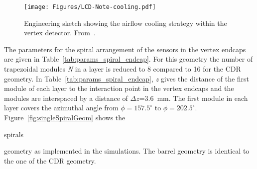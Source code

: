 
\begin{figure}[H]
  \centering
  \texttt{[image: Figures/LCD-Note-cooling.pdf]}
  \caption{Engineering sketch showing the airflow cooling strategy within the vertex detector. From~\cite{CoolingSimulations}.}\label{fig:spirals_cooling_simulations}
\end{figure}

The parameters for the spiral arrangement of the sensors in the vertex endcaps are given in Table~\ref{tab:params_spiral_endcap}. For this geometry the number of trapezoidal modules \textit{N} in a layer is reduced to 8 compared to 16 for the CDR geometry. In Table~\ref{tab:params_spiral_endcap}, \textit{z} gives the distance of the first module of each layer to the interaction point in the vertex endcaps and the modules are interspaced by a distance of $\Delta z$=3.6~mm. The first module in each layer covers the azimuthal angle from $\phi=157.5^{\circ}$ to $\phi=202.5^{\circ}$.\\
Figure~\ref{fig:singleSpiralGeom} shows the \begin{it}spirals\end{it} geometry as implemented in the simulations. The barrel geometry is identical to the one of the CDR geometry. 

